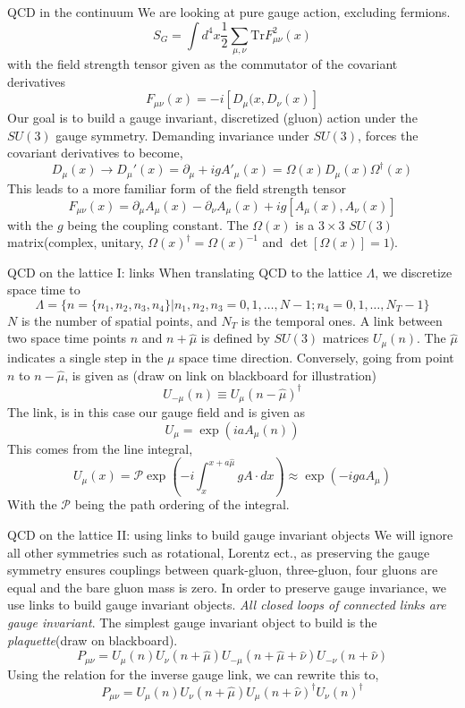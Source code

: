 \documentclass[10pt]{beamer}
\newcommand{\Tr}{\mathrm{Tr}}
\begin{document}
\begin{frame}{QCD in the continuum}
We are looking at pure gauge action, excluding fermions.
\[
S_G = \int d^4 x \frac{1}{2}\sum_{\mu,\nu}\Tr F_{\mu\nu}^2(x)
\]
with the field strength tensor given as the commutator of the covariant derivatives
\[
F_{\mu\nu}(x) = -i[D_\mu(x,D_\nu(x)]
\]
Our goal is to build a gauge invariant, discretized (gluon) action under the $SU(3)$ gauge symmetry. Demanding invariance under $SU(3)$, forces the covariant derivatives to become,
\[
D_\mu(x) \rightarrow D_\mu'(x) = \partial_\mu+igA'_\mu(x) = \Omega(x) D_\mu(x) \Omega^\dagger(x)
\]
This leads to a more familiar form of the field strength tensor
\[
F_{\mu\nu}(x) = \partial_\mu A_\mu(x) - \partial_\nu A_\mu(x) + ig[A_\mu(x), A_\nu(x)]
\]
with the $g$ being the coupling constant. The $\Omega(x)$ is a $3\times 3$ $SU(3)$ matrix(complex, unitary, $\Omega(x)^\dagger = \Omega(x)^{-1}$ and $\det[\Omega(x)]=1$).
\end{frame}


\begin{frame}{QCD on the lattice I: links}
When translating QCD to the lattice $\Lambda$, we discretize space time to 
\[
\Lambda = \{n=\{n_1,n_2,n_3,n_4\} | n_1,n_2,n_3 = 0,1,\dots,N-1; n_4 =0,1,\dots,N_T-1\}
\]
$N$ is the number of spatial points, and $N_T$ is the temporal ones. A link between two space time points $n$ and $n+\hat{\mu}$ is defined by $SU(3)$ matrices $U_\mu(n)$. The $\hat{\mu}$ indicates a single step in the $\mu$ space time direction. Conversely, going from point $n$ to $n-\hat{\mu}$, is given as (draw on link on blackboard for illustration)
\[
U_{-\mu}(n) \equiv U_{\mu}(n-\hat{\mu})^\dagger
\]
The link, is in this case our gauge field and is given as
\[
U_\mu = \exp(iaA_\mu(n))
\]
This comes from the line integral,
\[
U_\mu(x) = \mathcal{P}\exp\left(-i\int^{x+a\hat{\mu}}_x gA\cdot dx\right) \approx  \exp\left(-igaA_\mu\right)
\]
With the $\mathcal{P}$ being the path ordering of the integral.
\end{frame}


\begin{frame}{QCD on the lattice II: using links to build gauge invariant objects}
We will ignore all other symmetries such as rotational, Lorentz ect., as preserving the gauge symmetry ensures couplings between quark-gluon, three-gluon, four gluons are equal and the bare gluon mass is zero. In order to preserve gauge invariance, we use links to build gauge invariant objects. \textit{All closed loops of connected links are gauge invariant}. The simplest gauge invariant object to build is the \textit{plaquette}(draw on blackboard).
\[
P_{\mu\nu} = U_\mu(n)U_\nu(n+\hat{\mu})U_{-\mu}(n+\hat{\mu}+\hat{\nu})U_{-\nu}(n+\hat{\nu}) 
\]
Using the relation for the inverse gauge link, we can rewrite this to,
\[
P_{\mu\nu} = U_\mu(n)U_\nu(n+\hat{\mu})U_{\mu}(n+\hat{\nu})^\dagger U_{\nu}(n)^\dagger
\]
\end{frame}
\end{document}
